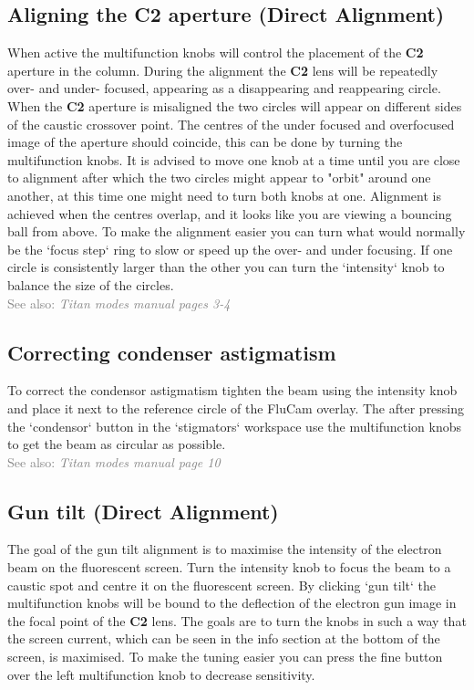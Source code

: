 \documentclass[a4paper]{scrartcl}
\begin{document}
\subsection*{Aligning the \textbf{C2} aperture (Direct Alignment)}
When active the multifunction knobs will control the placement of the \textbf{C2} aperture in the column. During the alignment the \textbf{C2} lens will be repeatedly over- and under- focused, appearing as a disappearing and reappearing circle. When the \textbf{C2} aperture is misaligned the two circles will appear on different sides of the caustic crossover point. The centres of the under focused and overfocused image of the aperture should coincide, this can be done by turning the multifunction knobs. It is advised to move one knob at a time until you are close to alignment after which the two circles might appear to "orbit" around one another, at this time one might need to turn both knobs at one. Alignment is achieved when the centres overlap, and it looks like you are viewing a bouncing ball from above. To make the alignment easier you can turn what would normally be the `focus step` ring to slow or speed up the over- and under focusing. If one circle is consistently larger than the other you can turn the `intensity` knob to balance the size of the circles.\\
\textcolor{gray}{See also: \textit{Titan modes manual pages 3-4}}

\subsection*{Correcting condenser astigmatism}
To correct the condensor astigmatism tighten the beam using the intensity knob and place it next to the reference circle of the FluCam overlay. The after pressing the `condensor` button in the `stigmators` workspace use the multifunction knobs to get the beam as circular as possible.\\
\textcolor{gray}{See also: \textit{Titan modes manual page 10}}

\subsection*{Gun tilt (Direct Alignment)}
The goal of the gun tilt alignment is to maximise the intensity of the electron beam on the fluorescent screen. Turn the intensity knob to focus the beam to a caustic spot and centre it on the fluorescent screen. By clicking `gun tilt` the multifunction knobs will be bound to the deflection of the electron gun image in the focal point of the \textbf{C2} lens. The goals are to turn the knobs in such a way that the screen current, which can be seen in the info section at the bottom of the screen, is maximised. To make the tuning easier you can press the fine button over the left multifunction knob to decrease sensitivity.
\end{document}
